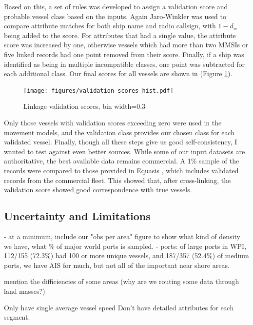 Based on this, a set of rules was developed to assign a validation score and probable vessel class based on the inputs.  Again Jaro-Winkler was used to compare attribute matches for both ship name and radio callsign, with $1 - d_w$ being added to the score. For attributes that had a single value, the attribute score was increased by one, otherwise vessels which had more than two MMSIs or five linked records had one point removed from their score. Finally, if a ship was identified as being in multiple incompatible classes, one point was subtracted for each additional class. Our final scores for all vessels are shown in (Figure \ref{fig:validation-score-hist}).

\begin{figure}[h!]
  \centering
    \texttt{[image: figures/validation-scores-hist.pdf]}
  \caption[Linkage validation scores]{Linkage validation scores, bin width=0.3}
  \label{fig:validation-score-hist}
\end{figure}

Only those vessels with validation scores exceeding zero were used in the movement models, and the validation class provides our chosen class for each validated vessel. Finally, though all these steps give us good self-consistency, I wanted to test against even better sources.  %
While some of our input datasets are authoritative, the best available data remains commercial. A 1\% sample of the records were compared to those provided in Equasis \citep{Equasis2011}, which includes validated records from the commercial fleet. This showed that, after cross-linking, the validation score showed good correspondence with true vessels.


\subsection{Uncertainty and Limitations}

- at a minimum, include our "obs per area" figure to show what kind of density we have, what \% of major world ports is sampled.
- ports: of large ports in WPI, 112/155 (72.3\%) had 100 or more unique vessels, and 187/357 (52.4\%) of medium ports, we have AIS for much, but not all of the important near shore areas.

mention the difficiencies of some areas (why are we routing some data through land masses?)

Only have single average vessel speed
Don't have detailed attributes for each segment.
